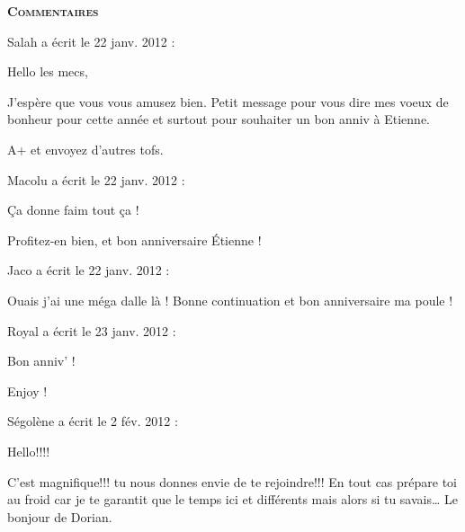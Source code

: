 \bigskip
\textbf{\textsc{Commentaires}}

\medskip
Salah  a écrit le 22 janv. 2012 :
\begin{displayquote}
Hello les mecs,

J'espère que vous vous amusez bien. Petit message pour vous dire mes voeux de bonheur pour cette année et surtout pour souhaiter un bon anniv à Etienne.

A+ et envoyez d'autres tofs.
\end{displayquote}

\medskip
Macolu a écrit le 22 janv. 2012 :
\begin{displayquote}
Ça donne faim tout ça !

Profitez-en bien, et bon anniversaire Étienne !
\end{displayquote}

\medskip
Jaco a écrit le 22 janv. 2012 :
\begin{displayquote}
Ouais j'ai une méga dalle là !
Bonne continuation et bon anniversaire ma poule !
\end{displayquote}

\medskip
Royal a écrit le 23 janv. 2012 :
\begin{displayquote}
Bon anniv' !

Enjoy !
\end{displayquote}

\medskip
Ségolène a écrit le 2 fév. 2012 :
\begin{displayquote}
Hello!!!!

C'est magnifique!!! tu nous donnes envie de te rejoindre!!!
En tout cas prépare toi au froid car je te garantit que le temps ici et différents mais alors si tu savais\dots
Le bonjour de Dorian.
\end{displayquote}


